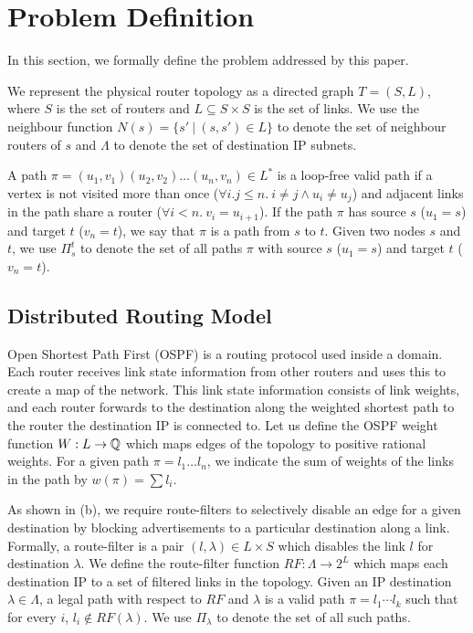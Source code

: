 \section{Problem Definition}
In this section, we formally define the problem addressed by this paper.

We represent the physical router topology as a directed graph $T=(S, L)$,
where $S$ is the set of routers and $L\subseteq S\times S$ is the set of links. 
We use the neighbour function $N(s) = \{s'\ | \ (s,s') \in L \}$ to denote 
the set of neighbour routers of $s$ and
$\Lambda$  to denote the set of destination IP subnets.

A path $\pi = (u_1,v_1) (u_2, v_2) \ldots (u_n, v_n) \in L^*$ is a loop-free valid path if
a  vertex is not visited more than once ($\forall i.j \leq n. 
~i \not= j \wedge u_i \not= u_j$) and adjacent links in the
path share a router ($\forall i < n. ~v_i = u_{i+1}$).
If the path $\pi$ has source $s$ ($u_1=s$) and target $t$ ($v_n=t$),
we say that $\pi$ is a path from $s$ to $t$.
Given two nodes $s$ and $t$, we use $\Pi_s^t$ to denote the set of all paths
$\pi$ with source $s$ ($u_1=s$) and target $t$ ($v_n=t$).

\subsection{Distributed Routing Model}
Open Shortest Path First (OSPF) is a routing protocol used inside a
domain. Each router receives link state information from other routers
and uses this to create a map of the network. This link state
information consists of link weights, and each router
forwards to the destination along the weighted shortest path 
to the router the destination IP is connected to. 
Let us
define the OSPF weight function $W: L \rightarrow \mathbb{Q}$ which 
maps edges of the topology to positive rational weights. 
For a given
path $\pi=l_1\ldots l_n$, we indicate the sum of weights of the
links in the path by $w(\pi)=\sum l_i$. 


As shown in (b), 
we require  route-filters
to selectively disable an
edge for a given destination by  
blocking advertisements to a
particular destination along a link. 
Formally, a route-filter is a pair $(l,\lambda)\in L\times S$
which disables the link $l$ for destination $\lambda$. 
We define the route-filter function 
$RF: \Lambda \rightarrow 2^L$ which maps each destination IP
to a set of filtered links in the topology. 
Given an IP destination $\lambda\in \Lambda$, 
a legal path with respect to $RF$ and $\lambda$
is a valid path $\pi=l_1\cdots l_k$ such that for every $i$,
$l_i\not\in RF(\lambda)$.
We use $\Pi_\lambda$ to denote the set of all such paths.


